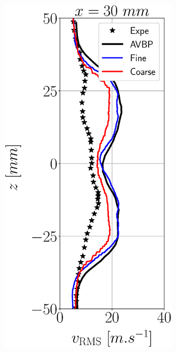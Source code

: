 \begin{figure}[h!]
\begin{subfigure}[b]{0.22\textwidth}
\end{subfigure}
   \hspace{0.05in}
\begin{subfigure}[b]{0.22\textwidth}
	\centering
   \includegraphics[scale=0.25]{./part3_applications/figures_ch7_aero/BIMER_validation_quantitative_lines/x30_w_vertical_rms.eps} 

\end{subfigure}
\end{figure}
